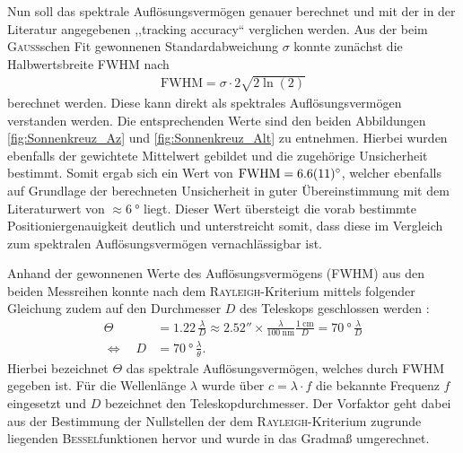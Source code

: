     Nun soll das spektrale Auflösungsvermögen genauer berechnet und mit der in der Literatur angegebenen ,,tracking accuracy`` verglichen werden.
    Aus der beim \textsc{Gauß}schen Fit gewonnenen Standardabweichung $\sigma$ konnte zunächst die Halbwertsbreite FWHM nach \cite{FWHM}
    \begin{align}
        \text{FWHM} = \sigma \cdot 2\sqrt{2\ln(2)} \label{eq:FWHM}
    \end{align}
    berechnet werden.
    Diese kann direkt als spektrales Auflösungsvermögen verstanden werden.
    Die entsprechenden Werte sind den beiden Abbildungen \ref{fig:Sonnenkreuz_Az} und \ref{fig:Sonnenkreuz_Alt} zu entnehmen. Hierbei wurden ebenfalls der gewichtete Mittelwert gebildet und die zugehörige Unsicherheit bestimmt.
    Somit ergab sich ein Wert von $\text{FWHM} = \SI{6.6 \pm 1.1}{\degree}$, welcher ebenfalls auf Grundlage der berechneten Unsicherheit in guter Übereinstimmung mit dem Literaturwert von $\approx \SI{6}{\degree}$ \cite{Usermanual} liegt. 
    Dieser Wert übersteigt die vorab bestimmte Positioniergenauigkeit deutlich und unterstreicht somit, dass diese im Vergleich zum spektralen Auflösungsvermögen vernachlässigbar ist.

    Anhand der gewonnenen Werte des Auflösungsvermögens (FWHM) aus den beiden Messreihen konnte nach dem \textsc{Rayleigh}-Kriterium mittels folgender Gleichung zudem auf den Durchmesser $D$ des Teleskops geschlossen werden \cite{Karttunen2013}:
    \begin{align}
        \Theta &= 1.22 \, \frac{\lambda}{D} \approx \ang{;;2.52} \times \frac{\lambda}{\SI{100}{\nano \metre}} \frac{\SI{1}{\centi \metre}}{D} = \SI{70}{\degree} \, \frac{\lambda}{D}\\
        \Leftrightarrow \quad D &= \SI{70}{\degree} \, \frac{\lambda}{\theta}.
    \end{align}
    Hierbei bezeichnet $\Theta$ das spektrale Auflösungsvermögen, welches durch FWHM gegeben ist. Für die Wellenlänge $\lambda$ wurde über $c = \lambda \cdot f$ die bekannte Frequenz $f$ eingesetzt und $D$ bezeichnet den Teleskopdurchmesser.
    Der Vorfaktor geht dabei aus der Bestimmung der Nullstellen der dem \textsc{Rayleigh}-Kriterium zugrunde liegenden \textsc{Bessel}funktionen hervor und wurde in das Gradmaß umgerechnet.

